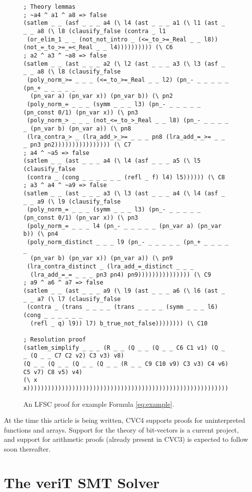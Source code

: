 \documentclass{llncs}
\begin{document}
\begin{figure}
{\begin{verbatim}
; Theory lemmas
; ~a4 ^ a1 ^ a8 => false
(satlem _ _ (asf _ _ _ a4 (\ l4 (ast _ _ _ a1 (\ l1 (ast _ _ _ a8 (\ l8 (clausify_false (contra _ l1
 (or_elim_1 _ _ (not_not_intro _ (<=_to_>=_Real _ _ l8)) (not_=_to_>=_=<_Real _ _ l4)))))))))) (\ C6 
; a2 ^ a3 ^ ~a8 => false
(satlem _ _ (ast _ _ _ a2 (\ l2 (ast _ _ _ a3 (\ l3 (asf _ _ _ a8 (\ l8 (clausify_false
 (poly_norm_>= _ _ _ (<=_to_>=_Real _ _ l2) (pn_- _ _ _ _ _ (pn_+ _ _ _ _ _
  (pn_var a) (pn_var x)) (pn_var b)) (\ pn2
 (poly_norm_= _ _ _ (symm _ _ _ l3) (pn_- _ _ _ _ _ (pn_const 0/1) (pn_var x)) (\ pn3
 (poly_norm_> _ _ _ (not_<=_to_>_Real _ _ l8) (pn_- _ _ _ _ _ (pn_var b) (pn_var a)) (\ pn8
 (lra_contra_> _ (lra_add_>_>= _ _ _ pn8 (lra_add_=_>= _ _ _ pn3 pn2)))))))))))))))) (\ C7
; a4 ^ ~a5 => false
(satlem _ _ (ast _ _ _ a4 (\ l4 (asf _ _ _ a5 (\ l5 (clausify_false
 (contra _ (cong _ _ _ _ _ _ (refl _ f) l4) l5)))))) (\ C8
; a3 ^ a4 ^ ~a9 => false
(satlem _ _ (ast _ _ _ a3 (\ l3 (ast _ _ _ a4 (\ l4 (asf _ _ _ a9 (\ l9 (clausify_false
 (poly_norm_= _ _ _ (symm _ _ _ l3) (pn_- _ _ _ _ _ (pn_const 0/1) (pn_var x)) (\ pn3
 (poly_norm_= _ _ _ l4 (pn_- _ _ _ _ _ (pn_var a) (pn_var b)) (\ pn4
 (poly_norm_distinct _ _ _ l9 (pn_- _ _ _ _ _ (pn_+ _ _ _ _ _
  (pn_var b) (pn_var x)) (pn_var a)) (\ pn9
 (lra_contra_distinct _ (lra_add_=_distinct _ _ _
  (lra_add_=_= _ _ _ pn3 pn4) pn9))))))))))))))) (\ C9
; a9 ^ a6 ^ a7 => false
(satlem _ _ (ast _ _ _ a9 (\ l9 (ast _ _ _ a6 (\ l6 (ast _ _ _ a7 (\ l7 (clausify_false
 (contra _ (trans _ _ _ _ (trans _ _ _ _ (symm _ _ _ l6) (cong _ _ _ _ _ _
  (refl _ q) l9)) l7) b_true_not_false)))))))) (\ C10

; Resolution proof
(satlem_simplify _ _ _ (R _ _ (Q _ _ (Q _ _ C6 C1 v1) (Q _ _ (Q _ _ C7 C2 v2) C3 v3) v8)
(Q _ _ (Q _ _ (Q _ _ (Q _ _ (R _ _ C9 C10 v9) C3 v3) C4 v6) C5 v7) C8 v5) v4)
(\ x x)))))))))))))))))))))))))))))))))))))))))))))))))))))))))))))))
\end{verbatim}
}
\caption{\label{fig:lfsc} An LFSC proof for example Formula \ref{eq:example}.}
\end{figure}

At the time this article is being written, CVC4 supports proofs for
uninterpreted functions and arrays.  Support for the theory of bit-vectors is a
current project, and support for arithmetic proofs (already present in
CVC3) is expected to follow soon thereafter.

\section{The veriT SMT Solver}
\label{sec:veriT}
\end{document}

